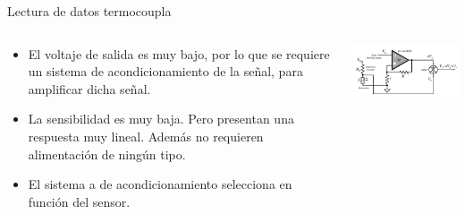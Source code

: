 \documentclass[aspectratio=169]{beamer}
\begin{document}
\begin{frame}{Lectura de datos termocoupla}
 \begin{columns}[c, onlytextwidth]
        \begin{column}{0.45\textwidth}
            \begin{itemize}
                \item El voltaje de salida es muy bajo, por lo que se requiere un sistema de acondicionamiento de la señal, para amplificar dicha señal.  
                \item La sensibilidad es muy baja. Pero presentan una respuesta muy lineal. Además no requieren alimentación de ningún tipo.
                \item El sistema a de acondicionamiento selecciona en función del sensor. 
                
            \end{itemize}
        \end{column}
        \begin{column}{0.5\textwidth}
            \includegraphics[width=7cm]{fig/thermocouple_circuit.PNG}
            \\ \cite{Fraden_2016}
        \end{column}
    \end{columns}
\end{frame}
\end{document}
